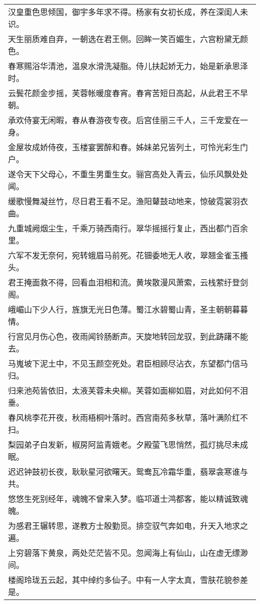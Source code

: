 \noindent\begin{minipage}{\linewidth}
  \vskip-3pt\begin{table}[H]
    \centering
    \begin{tabular}{@{}l@{}}
汉皇重色思倾国，御宇多年求不得。杨家有女初长成，养在深闺人未识。\\
天生丽质难自弃，一朝选在君王侧。回眸一笑百媚生，六宫粉黛无颜色。\\
春寒赐浴华清池，温泉水滑洗凝脂。侍儿扶起娇无力，始是新承恩泽时。\\
云鬓花颜金步摇，芙蓉帐暖度春宵。春宵苦短日高起，从此君王不早朝。\\
承欢侍宴无闲暇，春从春游夜专夜。后宫佳丽三千人，三千宠爱在一身。\\
金屋妆成娇侍夜，玉楼宴罢醉和春。姊妹弟兄皆列土，可怜光彩生门户。\\
遂令天下父母心，不重生男重生女。骊宫高处入青云，仙乐风飘处处闻。\\
缓歌慢舞凝丝竹，尽日君王看不足。渔阳鼙鼓动地来，惊破霓裳羽衣曲。\\
九重城阙烟尘生，千乘万骑西南行。翠华摇摇行复止，西出都门百余里。\\
六军不发无奈何，宛转蛾眉马前死。花钿委地无人收，翠翘金雀玉搔头。\\
君王掩面救不得，回看血泪相和流。黄埃散漫风萧索，云栈萦纡登剑阁。\\
峨嵋山下少人行，旌旗无光日色薄。蜀江水碧蜀山青，圣主朝朝暮暮情。\\
行宫见月伤心色，夜雨闻铃肠断声。天旋地转回龙驭，到此踌躇不能去。\\
马嵬坡下泥土中，不见玉颜空死处。君臣相顾尽沾衣，东望都门信马归。\\
归来池苑皆依旧，太液芙蓉未央柳。芙蓉如面柳如眉，对此如何不泪垂。\\
春风桃李花开夜，秋雨梧桐叶落时。西宫南苑多秋草，落叶满阶红不扫。\\
梨园弟子白发新，椒房阿监青娥老。夕殿萤飞思悄然，孤灯挑尽未成眠。\\
迟迟钟鼓初长夜，耿耿星河欲曙天。鸳鸯瓦冷霜华重，翡翠衾寒谁与共。\\
悠悠生死别经年，魂魄不曾来入梦。临邛道士鸿都客，能以精诚致魂魄。\\
为感君王辗转思，遂教方士殷勤觅。排空驭气奔如电，升天入地求之遍。\\
上穷碧落下黄泉，两处茫茫皆不见。忽闻海上有仙山，山在虚无缥渺间。\\
楼阁玲珑五云起，其中绰约多仙子。中有一人字太真，雪肤花貌参差是。\\

\end{tabular}
\end{table}
\end{minipage}
